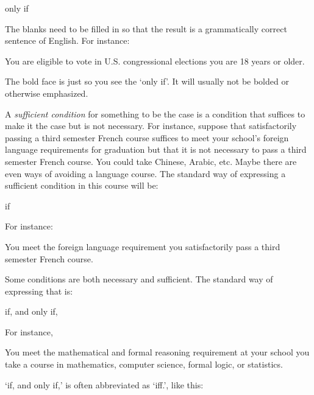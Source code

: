 \begin{center}
 \blank only if \blank

\end{center}

The blanks need to be filled in so that the result is a grammatically correct 
sentence of English. For instance:

\begin{center}
 You are eligible to vote in U.S. congressional elections  you 
 are 18 years or older.
\end{center}

The bold face is just so you see the `only if'. It will usually not be bolded or 
otherwise emphasized.


A \emph{sufficient condition} for something to be the case is a condition that 
suffices to make it the case but is not necessary. For instance, suppose that 
satisfactorily passing a third semester French course suffices to meet your 
school's foreign language requirements for graduation but that it is not 
necessary to pass a third semester French course.  You could take Chinese, 
Arabic, etc.  Maybe there are even ways of avoiding a language course.  The 
standard way of expressing a sufficient condition in this course will be:

\begin{center}
 \blank if \blank
\end{center}

For instance:

\begin{center}
 You meet the foreign language requirement  you satisfactorily pass a 
 third semester French course.
\end{center}

Some conditions are both necessary and sufficient. The standard way of 
expressing that is:

\begin{center}
 \blank if, and only if, \blank
\end{center}

For instance, 

\begin{center}
 You meet the mathematical and formal reasoning requirement at your school 
 you take a course in mathematics, computer science, 
formal logic, or statistics.  \end{center}

`if, and only if,' is often abbreviated as `iff.', like this:

